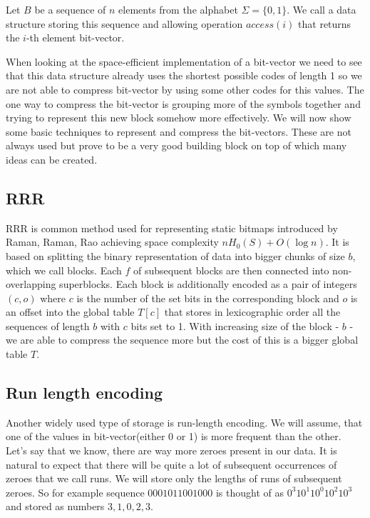 \begin{theorem}
Let $B$ be a sequence of $n$ elements from the alphabet $\Sigma = \{0, 1\}$. We call a data structure storing this sequence
and allowing operation $access(i)$ that returns the $i$-th element bit-vector.
\end{theorem}

When looking at the space-efficient implementation of a bit-vector we need to see that this data structure already uses the shortest possible codes of length 1 so we are not able to compress bit-vector by using some other codes for this values. The one way to compress the bit-vector is grouping more of the symbols together and trying to represent this new block somehow more effectively. We will now show some basic techniques to represent and compress the bit-vectors. These are not always used but prove to be a very good building block on top of which many ideas can be created.

\subsection{RRR}

RRR is common method used for representing static bitmaps introduced by Raman, Raman, Rao \cite{raman2007succinct} achieving space complexity $nH_0(S) + O(\log n)$. It is based on splitting the binary representation of data into bigger chunks of size $b$, which we call blocks.
Each $f$ of subsequent blocks are then connected into non-overlapping superblocks. Each block is additionally encoded as a pair of integers $(c, o)$ where $c$
is the number of the set bits in the corresponding block and $o$ is an offset into the global table $T[c]$ that stores in lexicographic order all the sequences of
length $b$ with $c$ bits set to 1. With increasing size of the block - $b$ - we are able to compress the sequence more but the cost of this is a bigger global table $T$.

\subsection{Run length encoding}

Another widely used type of storage is run-length encoding. We will assume, that one of the values in bit-vector(either 0 or 1) is more frequent than the other. Let's say that we know, there are way more zeroes present in our data. It is natural to expect that there will be quite a lot of subsequent occurrences of zeroes that we call runs. We will store only the lengths of runs of subsequent zeroes. So for example
sequence $0001011001000$ is thought of as $0^{3}10^{1}10^{0}10^{2}10^{3}$ and stored as numbers $3, 1, 0, 2, 3$.

